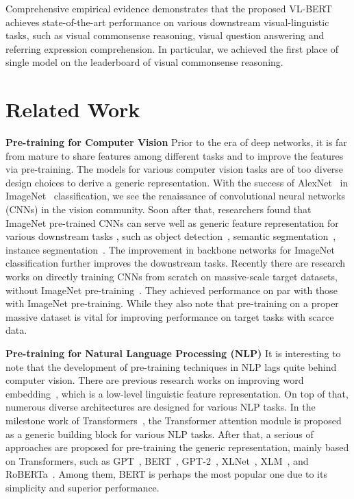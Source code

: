 \documentclass{article} \usepackage{iclr2020_conference,times}
\begin{document}
Comprehensive empirical evidence demonstrates that the proposed VL-BERT achieves state-of-the-art performance on various downstream visual-linguistic tasks, such as visual commonsense reasoning, visual question answering and referring expression comprehension. In particular, we achieved the first place of single model on the leaderboard of visual commonsense reasoning. 
 \section{Related Work}

\textbf{Pre-training for Computer Vision} Prior to the era of deep networks, it is far from mature to share features among different tasks and to improve the features via pre-training. The models for various computer vision tasks are of too diverse design choices to derive a generic representation. With the success of AlexNet~\citep{krizhevsky2012alexnet} in ImageNet~\citep{deng2009imagenet} classification, we see the renaissance of convolutional neural networks (CNNs) in the vision community. Soon after that, researchers found that ImageNet pre-trained CNNs can serve well as generic feature representation for various downstream tasks \citep{donahue2014decaf}, such as object detection~\citep{girshick2014rich}, semantic segmentation~\citep{long2015fcn}, instance segmentation~\citep{hariharan2014simultaneous}. The improvement in backbone networks for ImageNet classification further improves the downstream tasks. Recently there are research works on directly training CNNs from scratch on massive-scale target datasets, without ImageNet pre-training~\citep{he2018rethinking}. They achieved performance on par with those with ImageNet pre-training. While they also note that pre-training on a proper massive dataset is vital for improving performance on target tasks with scarce data.  



\textbf{Pre-training for Natural Language Processing (NLP)} It is interesting to note that the development of pre-training techniques in NLP lags quite behind computer vision. There are previous research works on improving word embedding~\citep{mikolov2013efficient,pennington2014glove,kiros2015skip}, which is a low-level linguistic feature representation. On top of that, numerous diverse architectures are designed for various NLP tasks. In the milestone work of Transformers~\citep{vaswani2017transformer}, the Transformer attention module is proposed as a generic building block for various NLP tasks. After that, a serious of approaches are proposed for pre-training the generic representation, mainly based on Transformers, such as GPT~\citep{radford2018GPT}, BERT~\citep{devlin2018bert}, GPT-2~\citep{radford2019GPT-2}, XLNet~\citep{yang2019xlnet}, XLM~\citep{lample2019xlm}, and RoBERTa~\citep{liu2019roberta}. Among them, BERT is perhaps the most popular one due to its simplicity and superior performance.
\end{document}
